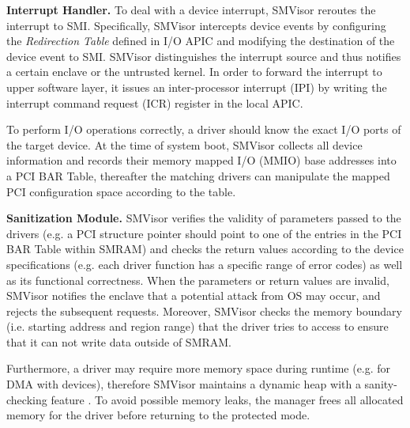 \textbf{Interrupt Handler.} To deal with a device interrupt, SMVisor reroutes the interrupt to SMI. Specifically, SMVisor intercepts device events by configuring the \textit{Redirection Table} defined in I/O APIC and modifying the destination of the device event to SMI. SMVisor distinguishes the interrupt source and thus notifies a certain enclave or the untrusted kernel. In order to forward the interrupt to upper software layer, it issues an inter-processor interrupt (IPI) by writing the interrupt command request (ICR) register in the local APIC. 

To perform I/O operations correctly, a driver should know the exact I/O ports of the target device. At the time of system boot, SMVisor collects all device information and records their memory mapped I/O (MMIO) base addresses into a \textsf{PCI BAR Table}, thereafter the matching drivers can manipulate the mapped PCI configuration space according to the table.

\textbf{Sanitization Module.}\label{shield}
SMVisor verifies the validity of parameters passed to the drivers (e.g. a PCI structure pointer should point to one of the entries in the \textsf{PCI BAR Table} within SMRAM) and checks the return values according to the device specifications (e.g. each driver function has a specific range of error codes) as well as its functional correctness. When the parameters or return values are invalid, SMVisor notifies the enclave that a potential attack from OS may occur, and rejects the subsequent requests. Moreover, SMVisor checks the memory boundary (i.e. starting address and region range) that the driver tries to access to ensure that it can not write data outside of SMRAM.

Furthermore, a driver may require more memory space during runtime (e.g. for DMA with devices), therefore SMVisor maintains a dynamic heap with a sanity-checking feature \cite{DBLP:conf/ccs/SilvestroLCLL17}. To avoid possible memory leaks, the manager frees all allocated memory for the driver before returning to the protected mode.

